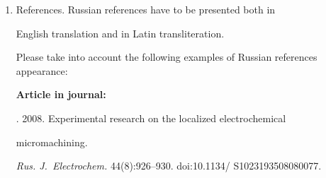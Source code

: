 {{\begin{enumerate}[1.]
\begin{itemize}
summary of the article that can be published separately. The abstract is the


main source of information on the article and it could be included in leading information


systems and data bases. The abstract in English has to be an original text and should


not be an exact translation of the Russian one. Good English is required.


In abstracts, avoid references and formulae.\\[-13.5pt]


\item Indexing is performed on the basis of keywords. The use of keywords from the


internationally accepted thematic Thesauri is recommended.





Important! Keywords must not be sentences.\\[-13.5pt]


\item Acknowledgments.


\end{itemize}





\item References. Russian references have to be presented both in


English translation and in Latin transliteration.





Please take into account the following examples of Russian references appearance:





\noindent


\textbf{Article in journal:}





. 2008. Experimental research on the localized electrochemical


micromachining.


\textit{Rus. J.~Electrochem.}  44(8):926--930. {\sf doi:10.1134/ S1023193508080077}.








\noindent



\end{enumerate}}}
